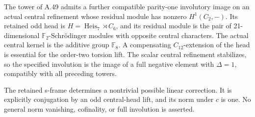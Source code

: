 The tower of A.49 admits a further compatible
parity-one involutory image on an actual central
refinement whose residual module has nonzero
\(H^1(C_2,-)\). Its retained odd head is
\(H=\operatorname{Heis}_7\rtimes C_6\), and
its residual module is the pair of
21-dimensional \(\mathbb F_2\)-Schr\"odinger modules
with opposite central characters. The actual
central kernel is the additive group \(\mathbb F_8\).
A compensating \(C_{12}\)-extension of the head
is essential for the order-two torsion lift.
The scalar central refinement stabilizes,
so the specified involution is the image of a
full negative element with \(\Delta=1\),
compatibly with all preceding towers.

The retained s-frame determines a nontrivial
possible linear correction. It is explicitly
conjugation by an odd central-head lift, and
its norm under \(c\) is one. No general norm
vanishing, cofinality, or full involution is
asserted.

